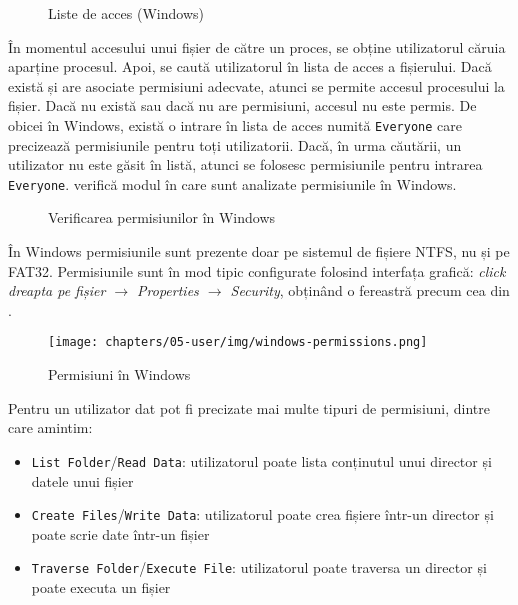 \begin{figure}[htbp]
  \centering
  \def\svgwidth{0.7\columnwidth}
  
  \caption{Liste de acces (Windows)}
  \label{fig:user:acl}
\end{figure}

În momentul accesului unui fișier de către un proces, se obține utilizatorul
căruia aparține procesul. Apoi, se caută utilizatorul în lista de acces a
fișierului. Dacă există și are asociate permisiuni adecvate, atunci se permite
accesul procesului la fișier. Dacă nu există sau dacă nu are permisiuni, accesul
nu este permis. De obicei în Windows, există o intrare în lista de acces numită
\texttt{Everyone} care precizează permisiunile pentru toți utilizatorii. Dacă, în urma
căutării, un utilizator nu este găsit în listă, atunci se folosesc permisiunile
pentru intrarea \texttt{Everyone}.  verifică modul în care sunt
analizate permisiunile în Windows.

\begin{figure}[htbp]
  \centering
  \def\svgwidth{0.9\columnwidth}
  
  \caption{Verificarea permisiunilor în Windows}
  \label{fig:user:windows-check-perm}
\end{figure}

În Windows permisiunile sunt prezente doar pe sistemul de fișiere NTFS, nu și pe FAT32. Permisiunile sunt în mod tipic configurate folosind
interfața grafică: \textit{click dreapta pe fișier $\rightarrow$ Properties $\rightarrow$ Security}, obținând o
fereastră precum cea din .

\begin{figure}[!htbp]
  \centering
  \texttt{[image: chapters/05-user/img/windows-permissions.png]}
  \caption{Permisiuni în Windows}
  \label{fig:user:windows-permissions}
\end{figure}

Pentru un utilizator dat pot fi precizate mai multe tipuri de permisiuni, dintre
care amintim:

\begin{itemize}
  \item \texttt{List Folder}/\texttt{Read Data}: utilizatorul poate lista conținutul unui
                director și datele unui fișier
  \item \texttt{Create Files}/\texttt{Write Data}: utilizatorul poate crea fișiere într-un
                director și poate scrie date într-un fișier
  \item \texttt{Traverse Folder}/\texttt{Execute File}: utilizatorul poate traversa un
                director și poate executa un fișier
\end{itemize}

